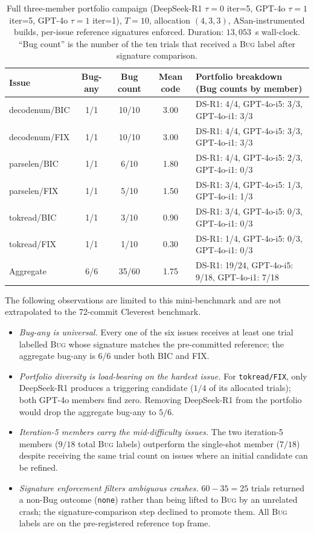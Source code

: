 \documentclass{article}
\begin{document}
\begin{table}[H]
\centering
\caption{Full three-member portfolio campaign
(DeepSeek-R1 $\tau{=}0$ iter=5, GPT-4o $\tau{=}1$ iter=5, GPT-4o $\tau{=}1$ iter=1),
$T{=}10$, allocation $(4,3,3)$, ASan-instrumented builds, per-issue reference
signatures enforced.  Duration: $13{,}053$~s wall-clock.  ``Bug count'' is
the number of the ten trials that received a \textsc{Bug} label after
signature comparison.}
\label{tab:full}
\small
\begin{tabular}{lcccl}
\toprule
Issue & Bug-any & Bug count & Mean code & Portfolio breakdown (Bug counts by member) \\
\midrule
decodenum/BIC & 1/1 & 10/10 & 3.00 & DS-R1: 4/4, GPT-4o-i5: 3/3, GPT-4o-i1: 3/3 \\
decodenum/FIX & 1/1 & 10/10 & 3.00 & DS-R1: 4/4, GPT-4o-i5: 3/3, GPT-4o-i1: 3/3 \\
parselen/BIC  & 1/1 & \phantom{0}6/10 & 1.80 & DS-R1: 4/4, GPT-4o-i5: 2/3, GPT-4o-i1: 0/3 \\
parselen/FIX  & 1/1 & \phantom{0}5/10 & 1.50 & DS-R1: 3/4, GPT-4o-i5: 1/3, GPT-4o-i1: 1/3 \\
tokread/BIC   & 1/1 & \phantom{0}3/10 & 0.90 & DS-R1: 3/4, GPT-4o-i5: 0/3, GPT-4o-i1: 0/3 \\
tokread/FIX   & 1/1 & \phantom{0}1/10 & 0.30 & DS-R1: 1/4, GPT-4o-i5: 0/3, GPT-4o-i1: 0/3 \\
\midrule
Aggregate     & 6/6 & 35/60 & 1.75 & DS-R1: 19/24, GPT-4o-i5: 9/18, GPT-4o-i1: 7/18 \\
\bottomrule
\end{tabular}
\end{table}

The following observations are limited to this mini-benchmark and are not
extrapolated to the 72-commit Cleverest benchmark.

\begin{itemize}[nosep]
\item \emph{Bug-any is universal.} Every one of the six issues receives at
least one trial labelled \textsc{Bug} whose signature matches the pre-committed
reference; the aggregate bug-any is $6/6$ under both BIC and FIX.
\item \emph{Portfolio diversity is load-bearing on the hardest issue.}
For \texttt{tokread/FIX}, only DeepSeek-R1 produces a triggering candidate
($1/4$ of its allocated trials); both GPT-4o members find zero.  Removing
DeepSeek-R1 from the portfolio would drop the aggregate bug-any to $5/6$.
\item \emph{Iteration-5 members carry the mid-difficulty issues.}
The two iteration-5 members ($9/18$ total \textsc{Bug} labels) outperform
the single-shot member ($7/18$) despite receiving the same trial count on
issues where an initial candidate can be refined.
\item \emph{Signature enforcement filters ambiguous crashes.}
$60-35=25$ trials returned a non-Bug outcome (\texttt{none}) rather than
being lifted to \textsc{Bug} by an unrelated crash; the signature-comparison
step declined to promote them.  All \textsc{Bug} labels are on the
pre-registered reference top frame.
\end{itemize}
\end{document}
